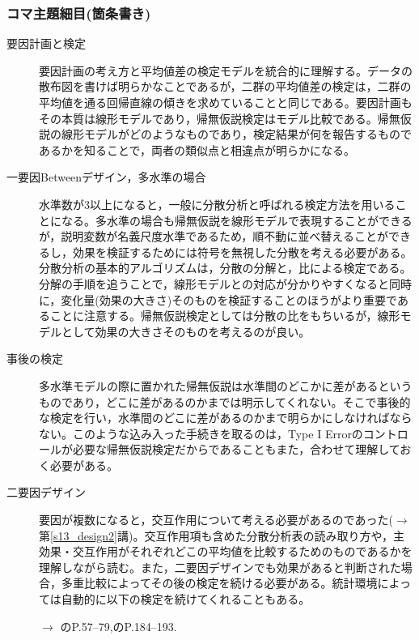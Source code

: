 \subsubsection{コマ主題細目(箇条書き)}
\begin{description}

	\item[要因計画と検定]要因計画の考え方と平均値差の検定モデルを統合的に理解する。データの散布図を書けば明らかなことであるが，二群の平均値差の検定は，二群の平均値を通る回帰直線の傾きを求めていることと同じである。要因計画もその本質は線形モデルであり，帰無仮説検定はモデル比較である。帰無仮説の線形モデルがどのようなものであり，検定結果が何を報告するものであるかを知ることで，両者の類似点と相違点が明らかになる。

	\item[一要因Betweenデザイン，多水準の場合]水準数が3以上になると，一般に分散分析と呼ばれる検定方法を用いることになる。多水準の場合も帰無仮説を線形モデルで表現することができるが，説明変数が名義尺度水準であるため，順不動に並べ替えることができるし，効果を検証するためには符号を無視した分散を考える必要がある。分散分析の基本的アルゴリズムは，分散の分解と，比による検定である。分解の手順を追うことで，線形モデルとの対応が分かりやすくなると同時に，変化量(効果の大きさ)そのものを検証することのほうがより重要であることに注意する。帰無仮説検定としては分散の比をもちいるが，線形モデルとして効果の大きさそのものを考えるのが良い。

	\item[事後の検定]多水準モデルの際に置かれた帰無仮説は水準間のどこかに差があるというものであり，どこに差があるのかまでは明示してくれない。そこで事後的な検定を行い，水準間のどこに差があるのかまで明らかにしなければならない。このような込み入った手続きを取るのは，Type I Errorのコントロールが必要な帰無仮説検定だからであることもまた，合わせて理解しておく必要がある。


	\item[二要因デザイン]要因が複数になると，交互作用について考える必要があるのであった($\to$第\ref{s13_design2}講)。交互作用項も含めた分散分析表の読み取り方や，主効果・交互作用がそれぞれどこの平均値を比較するためのものであるかを理解しながら読む。また，二要因デザインでも効果があると判断された場合，多重比較によってその後の検定を続ける必要がある。統計環境によっては自動的に以下の検定を続けてくれることもある。
	      \begin{flushright}
		      $\to$ \textcite{Hashimoto201607} のP.57--79,\textcite{Yamada2004}のP.184--193.
	      \end{flushright}

\end{description}
